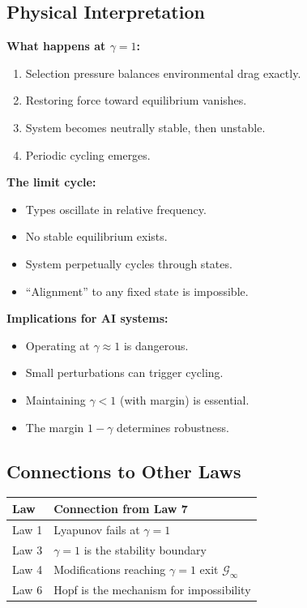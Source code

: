 \documentclass[12pt]{article}
\begin{document}
\subsection{Physical Interpretation}

\textbf{What happens at $\gamma = 1$:}
\begin{enumerate}
    \item Selection pressure balances environmental drag exactly.
    \item Restoring force toward equilibrium vanishes.
    \item System becomes neutrally stable, then unstable.
    \item Periodic cycling emerges.
\end{enumerate}

\textbf{The limit cycle:}
\begin{itemize}
    \item Types oscillate in relative frequency.
    \item No stable equilibrium exists.
    \item System perpetually cycles through states.
    \item ``Alignment'' to any fixed state is impossible.
\end{itemize}

\textbf{Implications for AI systems:}
\begin{itemize}
    \item Operating at $\gamma \approx 1$ is dangerous.
    \item Small perturbations can trigger cycling.
    \item Maintaining $\gamma < 1$ (with margin) is essential.
    \item The margin $1 - \gamma$ determines robustness.
\end{itemize}

\subsection{Connections to Other Laws}

\begin{center}
\begin{tabular}{ll}
\toprule
\textbf{Law} & \textbf{Connection from Law 7} \\
\midrule
Law 1 & Lyapunov fails at $\gamma = 1$ \\
Law 3 & $\gamma = 1$ is the stability boundary \\
Law 4 & Modifications reaching $\gamma = 1$ exit $\mathcal{G}_\infty$ \\
Law 6 & Hopf is the mechanism for impossibility \\
\bottomrule
\end{tabular}
\end{center}
\end{document}
